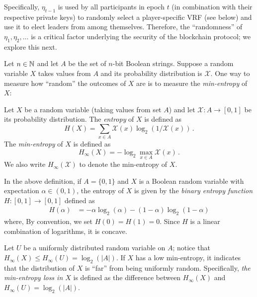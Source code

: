 Specifically, $\eta_{t-1}$ is used by all participants in epoch $t$ 
(in combination with their respective private keys) 
to randomly select a player-specific VRF (see below) 
and use it to elect leaders from among themselves.
Therefore, the ``randomness''
of $\eta_1, \eta_2, \ldots$ is a critical factor underlying 
the security of the blockchain protocol; 
we explore this next.

Let $n \in \mathbb{N}$ and let $A$ be the set of $n$-bit Boolean strings.
Suppose a random variable $X$ takes values from $A$
and its probability distribution is $\mathcal{X}$. 
One way to measure how ``random'' the outcomes of $X$ are 
is to measure the \emph{min-entropy} of $X$:

\begin{definition}
    Let $X$ be a random variable (taking values from set $A$) 
    and let $\mathcal{X} : A \rightarrow [0,1]$ be its probability distribution.
    The \emph{entropy} of $X$ is defined as 
    \begin{equation}\label{def:entropy}
        H(X) = \sum_{x \in A} \mathcal{X}(x) \log_2 (1/\mathcal{X}(x))
        \,.
    \end{equation}
    The \emph{min-entropy} of $X$ is defined as 
    \begin{equation}\label{def:min-entropy}
        H_\infty(X) = - \log_2 \max_{x \in A} \mathcal{X}(x)
        \,.
    \end{equation}
    We also write $H_\infty(\mathcal{X})$ to denote the min-entropy of $X$.
\end{definition}
\noindent

In the above definition, 
if $A = \{0,1\}$ and $X$ is a Boolean random variable with expectation $\alpha \in (0,1)$, 
the entropy of $X$ is given by 
the \emph{binary entropy function} $H: [0,1] \rightarrow [0,1]$ defined as 
\begin{align}\label{eq:binary-entropy}
    H(\alpha) &= -\alpha \log_2(\alpha) - (1-\alpha) \log_2(1-\alpha)
\end{align}
where, By convention, we set $H(0) = H(1) = 0$. 
Since $H$ is a linear combination of logarithms, it is concave. 

Let $U$ be a uniformly distributed random variable on $A$; 
notice that $H_\infty(X) \leq H_\infty(U) = \log_2(|A|)$. 
If $X$ has a low min-entropy, 
it indicates that the distribution of $X$ is ``far'' from being uniformly random. 
Specifically, \emph{the min-entropy loss in $X$} 
is defined as the difference between $H_\infty(X)$ and $H_\infty(U) = \log_2(|A|)$.


